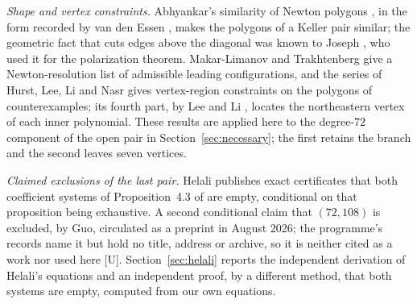 \documentclass[11pt]{article}
\theoremstyle{remark}
\begin{document}
\emph{Shape and vertex constraints.} Abhyankar's similarity of Newton polygons
\cite{Abhyankar1977}, in the form recorded by van den Essen \cite{vdEssen2000}, makes the polygons
of a Keller pair similar; the geometric fact that cuts edges above the diagonal was known to Joseph \cite{Joseph1975}, who used it for the polarization theorem. Makar-Limanov and Trakhtenberg \cite{MakarLimanovTrakhtenberg2024}
give a Newton-resolution list of admissible leading configurations, and the series of Hurst, Lee, Li and Nasr
\cite{HurstLeeLiNasr2022} gives vertex-region constraints on the polygons of counterexamples; its fourth part, by Lee and Li \cite{LeeLi2024}, locates the northeastern vertex of each inner
polynomial. These results are applied here to the degree-$72$ component of the open pair in
Section~\ref{sec:necessary}; the first retains the branch and the second leaves seven vertices.

\emph{Claimed exclusions of the last pair.} Helali \cite{Helali2026} publishes exact certificates
that both coefficient systems of Proposition~4.3 of \cite{GGHV2022} are empty, conditional on that
proposition being exhaustive. A second conditional claim that $(72,108)$ is excluded, by Guo, circulated
as a preprint in August 2026; the programme's records name it but hold no title, address or archive, so it is
neither cited as a work nor used here [U]. Section~\ref{sec:helali} reports the independent
derivation of Helali's equations and an independent proof, by a different method, that both systems are empty, computed from our own equations.
\end{document}
